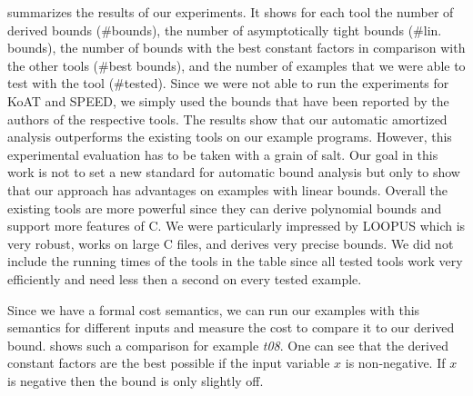 \documentclass[nocopyrightspace,preprint]{sigplanconf}
\newcommand{\pref}[1]{\prettyref{#1}}
\begin{document}
\pref{tab:compar} summarizes the results of our experiments.  It shows
for each tool the number of derived bounds (\#bounds), the number of
asymptotically tight bounds (\#lin. bounds), the number of bounds with
the best constant factors in comparison with the other tools (\#best
bounds), and the number of examples that we were able to test with the
tool (\#tested).  Since we were not able to run the experiments for KoAT
and SPEED, we simply used the bounds that have been reported by the
authors of the respective tools.  The results show that our automatic
amortized analysis outperforms the existing tools on our example
programs.  However, this experimental evaluation has to be taken with
a grain of salt.  Our goal in this work is not to set a new standard
for automatic bound analysis but only to show that our approach has
advantages on examples with linear bounds.  Overall the existing tools
are more powerful since they can derive polynomial bounds and support
more features of C.  We were particularly impressed by LOOPUS which is
very robust, works on large C files, and derives very precise bounds.
We did not include the running times of the tools in the table since
all tested tools work very efficiently and need less then a second
on every tested example.

Since we have a formal cost semantics, we can run our examples with
this semantics for different inputs and measure the cost to compare it
to our derived bound.  \pref{fig:3d} shows such a comparison for
example \emph{t08}.  One can see that the derived constant factors are the
best possible if the input variable $x$ is non-negative.  If $x$ is
negative then the bound is only slightly off.
\end{document}
